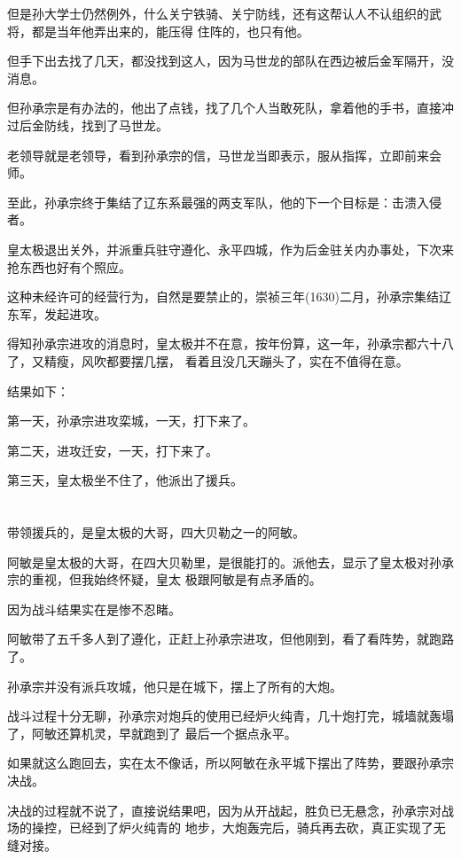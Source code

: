 \documentclass[11pt,a4paper,onecolumn]{article}
\begin{document}
但是孙大学士仍然例外，什么关宁铁骑、关宁防线，还有这帮认人不认组织的武将，都是当年他弄出来的，能压得
住阵的，也只有他。

但手下出去找了几天，都没找到这人，因为马世龙的部队在西边被后金军隔开，没消息。

但孙承宗是有办法的，他出了点钱，找了几个人当敢死队，拿着他的手书，直接冲过后金防线，找到了马世龙。

老领导就是老领导，看到孙承宗的信，马世龙当即表示，服从指挥，立即前来会师。

至此，孙承宗终于集结了辽东系最强的两支军队，他的下一个目标是：击溃入侵者。

皇太极退出关外，并派重兵驻守遵化、永平四城，作为后金驻关内办事处，下次来抢东西也好有个照应。

这种未经许可的经营行为，自然是要禁止的，崇祯三年(1630)二月，孙承宗集结辽东军，发起进攻。

得知孙承宗进攻的消息时，皇太极并不在意，按年份算，这一年，孙承宗都六十八了，又精瘦，风吹都要摆几摆，
看着且没几天蹦头了，实在不值得在意。

结果如下：

第一天，孙承宗进攻栾城，一天，打下来了。

第二天，进攻迁安，一天，打下来了。

第三天，皇太极坐不住了，他派出了援兵。

\section[\thesection]{}

带领援兵的，是皇太极的大哥，四大贝勒之一的阿敏。

阿敏是皇太极的大哥，在四大贝勒里，是很能打的。派他去，显示了皇太极对孙承宗的重视，但我始终怀疑，皇太
极跟阿敏是有点矛盾的。

因为战斗结果实在是惨不忍睹。

阿敏带了五千多人到了遵化，正赶上孙承宗进攻，但他刚到，看了看阵势，就跑路了。

孙承宗并没有派兵攻城，他只是在城下，摆上了所有的大炮。

战斗过程十分无聊，孙承宗对炮兵的使用已经炉火纯青，几十炮打完，城墙就轰塌了，阿敏还算机灵，早就跑到了
最后一个据点\myrule 永平。

如果就这么跑回去，实在太不像话，所以阿敏在永平城下摆出了阵势，要跟孙承宗决战。

决战的过程就不说了，直接说结果吧，因为从开战起，胜负已无悬念，孙承宗对战场的操控，已经到了炉火纯青的
地步，大炮轰完后，骑兵再去砍，真正实现了无缝对接。
\end{document}
